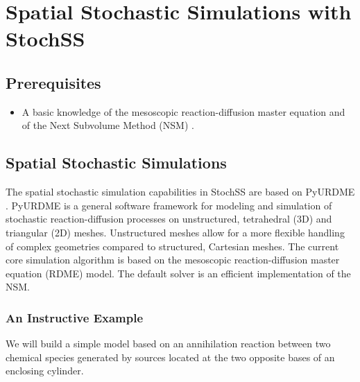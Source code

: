 \chapter{Spatial Stochastic Simulations with StochSS}

\section{\label{sec:pre}Prerequisites}
\begin{itemize}
\item A basic knowledge of the mesoscopic reaction-diffusion master equation and of the Next Subvolume Method (NSM) \cite{nsm}.
\end{itemize}


\newpage

\section{Spatial Stochastic Simulations}
The spatial stochastic simulation capabilities in StochSS are based on PyURDME \cite{urdme}. PyURDME is a general software framework for modeling and simulation of stochastic reaction-diffusion processes on unstructured, tetrahedral (3D) and triangular (2D) meshes. Unstructured meshes allow for a more flexible handling of complex geometries compared to structured, Cartesian meshes. The current core simulation algorithm is based on the mesoscopic reaction-diffusion master equation (RDME) model. The default solver is an efficient implementation of the NSM.

\subsection{An Instructive Example}
We will build a simple model based on an annihilation reaction between two chemical species generated  by sources located at the two opposite bases of an enclosing cylinder.

